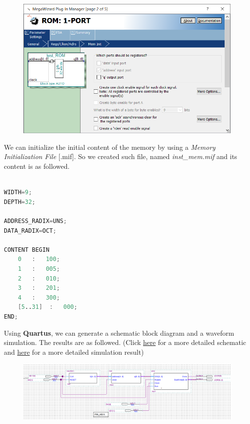 \begin{figure}[h]
    \centering
    \includegraphics[width = 5.5in]{source/picture/Lab09/Create_ROM_2.png}
\end{figure}

We can initialize the initial content of the memory by using a \textit{Memory Initialization File} [.mif]. So we created such file, named \textit{inst\_mem.mif} and its content is as followed.
\newpage

\begin{lstlisting}[language=verilog]

WIDTH=9;
DEPTH=32;

ADDRESS_RADIX=UNS;
DATA_RADIX=OCT;

CONTENT BEGIN
    0   :   100;
    1   :   005;
    2   :   010;
    3   :   201;
    4   :   300;
    [5..31]  :   000;
END;
\end{lstlisting}

\newpage

Using \textbf{Quartus}, we can generate a schematic block diagram and a waveform simulation. The results are as followed. (Click \href{https://drive.google.com/file/d/1bG-vFAlYrJjy5utJ4DoETYb3e9kJMEU5/view?usp=sharing}{here} for a more detailed schematic and \href{https://drive.google.com/file/d/1yXu4M1fxIND9-f9YMr3JbLg8KXuOInd-/view?usp=sharing}{here} for a more detailed simulation result)

\begin{figure}[h]
    \centering
    \includegraphics[width=6.1in]{source/picture/Lab09/Lab9_2.png}
\end{figure}

